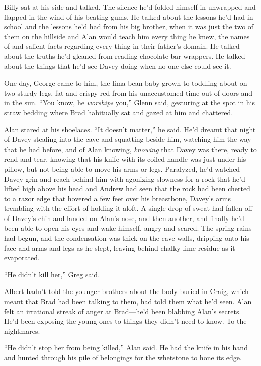 Billy sat at his side and talked.  The silence he'd folded himself in
unwrapped and flapped in the wind of his beating gums.  He talked
about the lessons he'd had in school and the lessons he'd had from his
big brother, when it was just the two of them on the hillside and Alan
would teach him every thing he knew, the names of and salient facts
regarding every thing in their father's domain.  He talked about the
truths he'd gleaned from reading chocolate-bar wrappers.  He talked
about the things that he'd see Davey doing when no one else could see
it.

One day, George came to him, the lima-bean baby grown to toddling
about on two sturdy legs, fat and crispy red from his unaccustomed
time out-of-doors and in the sun.  ``You know, he \textit{worships}
you,'' Glenn said, gesturing at the spot in his straw bedding where
Brad habitually sat and gazed at him and chattered.

Alan stared at his shoelaces.  ``It doesn't matter,'' he said.  He'd
dreamt that night of Davey stealing into the cave and squatting beside
him, watching him the way that he had before, and of Alan knowing,
\textit{knowing} that Davey was there, ready to rend and tear, knowing
that his knife with its coiled handle was just under his pillow, but
not being able to move his arms or legs.  Paralyzed, he'd watched
Davey grin and reach behind him with agonizing slowness for a rock
that he'd lifted high above his head and Andrew had seen that the rock
had been cherted to a razor edge that hovered a few feet over his
breastbone, Davey's arms trembling with the effort of holding it
aloft.  A single drop of sweat had fallen off of Davey's chin and
landed on Alan's nose, and then another, and finally he'd been able to
open his eyes and wake himself, angry and scared.  The spring rains
had begun, and the condensation was thick on the cave walls, dripping
onto his face and arms and legs as he slept, leaving behind chalky
lime residue as it evaporated.

``He didn't kill her,'' Greg said.

Albert hadn't told the younger brothers about the body buried in
Craig, which meant that Brad had been talking to them, had told them
what he'd seen.  Alan felt an irrational streak of anger at
Brad---he'd been blabbing Alan's secrets.  He'd been exposing the
young ones to things they didn't need to know.  To the nightmares.

``He didn't stop her from being killed,'' Alan said.  He had the knife
in his hand and hunted through his pile of belongings for the
whetstone to hone its edge.


